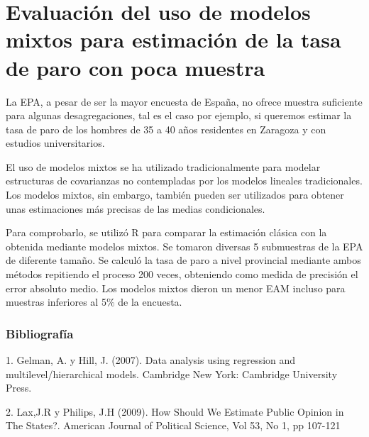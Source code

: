 \chapter{Evaluación del uso de modelos mixtos para estimación de la tasa de paro con poca muestra}




La EPA, a pesar de ser la mayor encuesta de España, no ofrece muestra suficiente para algunas desagregaciones, tal es el caso por ejemplo, si queremos estimar la tasa de paro de los hombres de 35 a 40 años residentes en Zaragoza y con estudios universitarios.

El uso de modelos mixtos se ha utilizado tradicionalmente para modelar estructuras de covarianzas no contempladas por los modelos lineales tradicionales. Los modelos mixtos, sin embargo, también pueden ser utilizados para obtener unas estimaciones más precisas de las medias condicionales.

Para comprobarlo, se utilizó R para comparar la estimación clásica con la obtenida mediante modelos mixtos. Se tomaron diversas 5 submuestras de la EPA de diferente tamaño. Se calculó la tasa de paro a nivel provincial mediante ambos métodos repitiendo el proceso 200 veces, obteniendo como medida de precisión el error absoluto medio. Los modelos mixtos dieron un menor EAM incluso para muestras inferiores al 5\% de la encuesta.
 \bigskip\subsection*{Bibliografía}

 1. Gelman, A. y Hill, J. (2007). Data analysis using regression and multilevel/hierarchical models. Cambridge New York: Cambridge University Press.

2. Lax,J.R y Philips, J.H (2009). How Should We Estimate Public Opinion in The States?. American Journal of Political Science, Vol 53, No 1, pp 107-121

%

%
